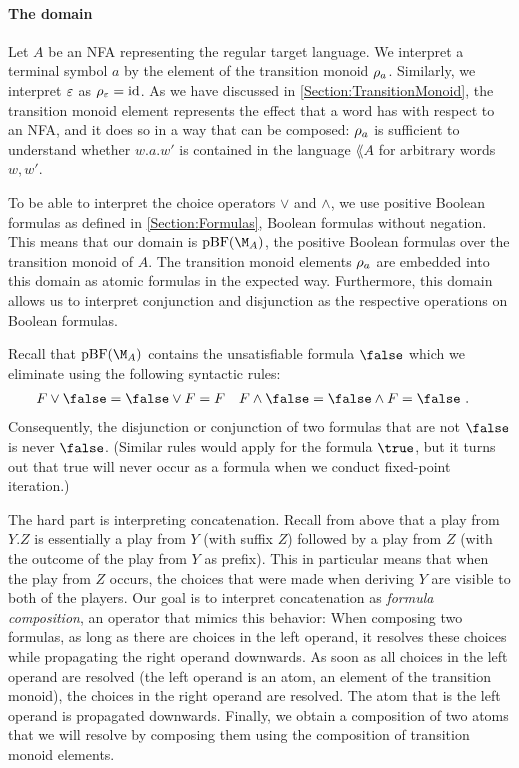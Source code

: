 \documentclass[../../diss.tex]{subfiles}
\begin{document}

\paragraph{The domain}

Let $A$ be an NFA representing the regular target language.
We interpret a terminal symbol $a$ by the element of the transition monoid $\tbox{a}$.
Similarly, we interpret $\varepsilon$ as $\tbox{\eps} = \id$.
As we have discussed in \cref{Section:TransitionMonoid}, the transition monoid element represents the effect that a word has with respect to an NFA, and it does so in a way that can be composed: $\tbox{a}$ is sufficient to understand whether $w.a.w'$ is contained in the language $\lang{A}$ for arbitrary words $w,w'$.

To be able to interpret the choice operators $\vee$ and $\wedge$, we use positive Boolean formulas as defined in \cref{Section:Formulas}, Boolean formulas without negation.
This means that our domain is $\pBF(\nfatransmonoid{A})$, the positive Boolean formulas over the transition monoid of $A$.
The transition monoid elements $\tbox{a}$ are embedded into this domain as atomic formulas in the expected way.
Furthermore, this domain allows us to interpret conjunction and disjunction as the respective operations on Boolean formulas.

Recall that $\pBF(\nfatransmonoid{A})$ contains the unsatisfiable formula $\false$ which we eliminate using the following syntactic rules:
\begin{align*}
    F \vee \false &= \false \vee F = F
    &
    F \wedge \false &= \false \wedge F = \false
    \ .
\end{align*}
Consequently, the disjunction or conjunction of two formulas that are not $\false$ is never $\false$.
(Similar rules would apply for the formula $\true$, but it turns out that true will never occur as a formula when we conduct fixed-point iteration.)

The hard part is interpreting concatenation.
Recall from above that a play from $Y.Z$ is essentially a play from $Y$ (with suffix $Z$) followed by a play from $Z$ (with the outcome of the play from $Y$ as prefix).
This in particular means that when the play from $Z$ occurs, the choices that were made when deriving $Y$ are visible to both of the players.
Our goal is to interpret concatenation as \emph{formula composition}, an operator that mimics this behavior:
When composing two formulas, as long as there are choices in the left operand, it resolves these choices while propagating the right operand downwards.
As soon as all choices in the left operand are resolved (\ie the left operand is an atom, an element of the transition monoid), the choices in the right operand are resolved.
The atom that is the left operand is propagated downwards.
Finally, we obtain a composition of two atoms that we will resolve by composing them using the composition of transition monoid elements.
\end{document}
